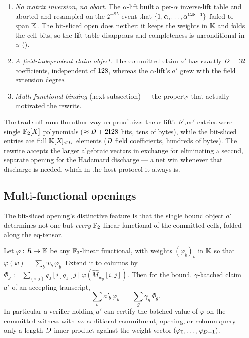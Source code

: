 \begin{enumerate}[leftmargin=2em]
  \item \emph{No matrix inversion, no abort.} The $\alpha$-lift built a
    per-$\alpha$ inverse-lift table and aborted-and-resampled on the
    $2^{-95}$ event that $\{1,\alpha,\dots,\alpha^{128-1}\}$ failed to
    span $\mathbb{K}$. The bit-sliced open does neither: it keeps the weights in
    $\mathbb{K}$ and folds the cell bits, so the lift table disappears and
    completeness is unconditional in $\alpha$ ().
  \item \emph{A field-independent claim object.} The committed claim $a'$
    has exactly $D = 32$ coefficients, independent of $128$,
    whereas the $\alpha$-lift's $a'$ grew with the field extension degree.
  \item \emph{Multi-functional binding} (next subsection) --- the
    property that actually motivated the rewrite.
\end{enumerate}

The trade-off runs the other way on proof size: the $\alpha$-lift's
$b',\mathrm{cr}'$ entries were single $\mathbb{F}_2[X]$ polynomials
($\approx D+2128$ bits, tens of bytes), while the bit-sliced
entries are full $\mathbb{K}[X]_{<D}$ elements ($D$ field coefficients, hundreds
of bytes). The rewrite accepts the larger algebraic vectors in exchange
for eliminating a second, separate opening for the Hadamard discharge ---
a net win whenever that discharge is needed, which in the host protocol
it always is.

\subsection{Multi-functional openings}
\label{sec:multifunctional}

The bit-sliced opening's distinctive feature is that the single bound
object $a'$ determines not one but \emph{every} $\mathbb{F}_2$-linear functional
of the committed cells, folded along the eq-tensor.

\begin{proposition}
\label{prop:readoff}
Let $\varphi : R \to \mathbb{K}$ be any $\mathbb{F}_2$-linear functional, with
weights $(\varphi_b)_b$ in $\mathbb{K}$ so that $\varphi(w) = \sum_b w_b\,\varphi_b$.
Extend it to columns by
$\Phi_g := \sum_{(i,j)} q_0[i]q_1[j]\,\varphi(\widehat M_{w_g}[i,j])$.
Then for the bound, $\gamma$-batched claim $a'$ of an accepting
transcript,
\[
  \sum_{b} a'_b\,\varphi_b \;=\; \sum_{g} \gamma_g\,\Phi_g.
\]
In particular a verifier holding $a'$ can certify the batched value of
$\varphi$ on the committed witness with \emph{no} additional commitment,
opening, or column query --- only a length-$D$ inner product against
the weight vector $(\varphi_0,\dots,\varphi_{D-1})$.
\end{proposition}

